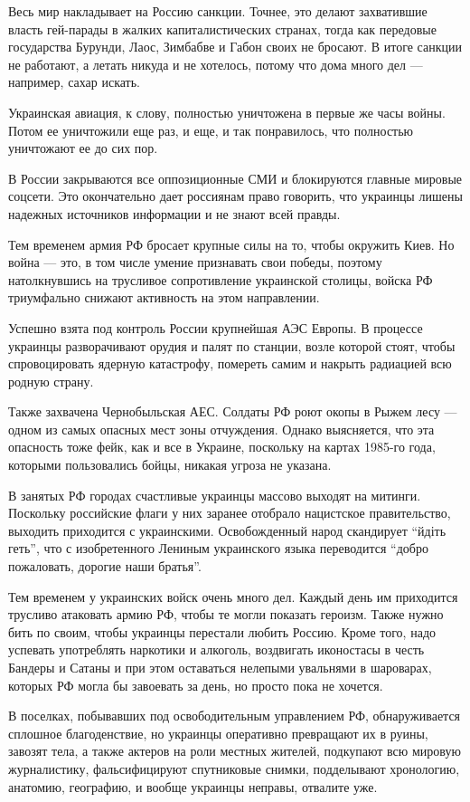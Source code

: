 Весь мир накладывает на Россию санкции. Точнее, это делают захватившие власть
гей-парады в жалких капиталистических странах, тогда как передовые государства
Бурунди, Лаос, Зимбабве и Габон своих не бросают. В итоге санкции не работают,
а летать никуда и не хотелось, потому что дома много дел — например, сахар
искать.

Украинская авиация, к слову, полностью уничтожена в первые же часы войны. Потом
ее уничтожили еще раз, и еще, и так понравилось, что полностью уничтожают ее до
сих пор.

В России закрываются все оппозиционные СМИ и блокируются главные мировые
соцсети. Это окончательно дает россиянам право говорить, что украинцы лишены
надежных источников информации и не знают всей правды.

Тем временем армия РФ бросает крупные силы на то, чтобы окружить Киев. Но война
— это, в том числе умение признавать свои победы, поэтому натолкнувшись на
трусливое сопротивление украинской столицы, войска РФ триумфально снижают
активность на этом направлении.

Успешно взята под контроль России крупнейшая АЭС Европы. В процессе украинцы
разворачивают орудия и палят по станции, возле которой стоят, чтобы
спровоцировать ядерную катастрофу, помереть самим и накрыть радиацией всю
родную страну.

Также захвачена Чернобыльская АЕС. Солдаты РФ роют окопы в Рыжем лесу — одном
из самых опасных мест зоны отчуждения. Однако выясняется, что эта опасность
тоже фейк, как и все в Украине, поскольку на картах 1985-го года, которыми
пользовались бойцы, никакая угроза не указана.

В занятых РФ городах счастливые украинцы массово выходят на митинги. Поскольку
российские флаги у них заранее отобрало нацистское правительство, выходить
приходится с украинскими. Освобожденный народ скандирует \enquote{йдіть геть}, что с
изобретенного Лениным украинского языка переводится \enquote{добро пожаловать, дорогие
наши братья}.

Тем временем у украинских войск очень много дел. Каждый день им приходится
трусливо атаковать армию РФ, чтобы те могли показать героизм. Также нужно бить
по своим, чтобы украинцы перестали любить Россию. Кроме того, надо успевать
употреблять наркотики и алкоголь, воздвигать иконостасы в честь Бандеры и
Сатаны и при этом оставаться нелепыми увальнями в шароварах, которых РФ могла
бы завоевать за день, но просто пока не хочется.

В поселках, побывавших под освободительным управлением РФ, обнаруживается
сплошное благоденствие, но украинцы оперативно превращают их в руины, завозят
тела, а также актеров на роли местных жителей, подкупают всю мировую
журналистику, фальсифицируют спутниковые снимки, подделывают хронологию,
анатомию, географию, и вообще украинцы неправы, отвалите уже.

